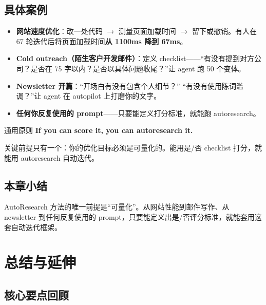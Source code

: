 \documentclass[a4paper]{article}
\begin{document}
\subsection{具体案例}

\begin{itemize}
    \item \textbf{网站速度优化}：改一处代码 $\to$ 测量页面加载时间 $\to$ 留下或撤销。有人在 67 轮迭代后将页面加载时间\textbf{从 1100ms 降到 67ms}。

    \item \textbf{Cold outreach（陌生客户开发邮件）}：定义 checklist——``有没有提到对方公司？是否在 75 字以内？是否以具体问题收尾？''让 agent 跑 50 个变体。

    \item \textbf{Newsletter 开篇}：``开场白有没有包含个人细节？'' ``有没有使用陈词滥调？''让 agent 在 autopilot 上打磨你的文字。

    \item \textbf{任何你反复使用的 prompt}——只要能定义打分标准，就能跑 autoresearch。
\end{itemize}

\begin{importantbox}{通用原则}
\textbf{If you can score it, you can autoresearch it.}

关键前提只有一个：你的优化目标必须是可量化的。能用是/否 checklist 打分，就能用 autoresearch 自动迭代。
\end{importantbox}

\subsection{本章小结}

AutoResearch 方法的唯一前提是``可量化''。从网站性能到邮件写作、从 newsletter 到任何反复使用的 prompt，只要能定义出是/否评分标准，就能套用这套自动迭代框架。

\section{总结与延伸}

\subsection{核心要点回顾}
\end{document}

